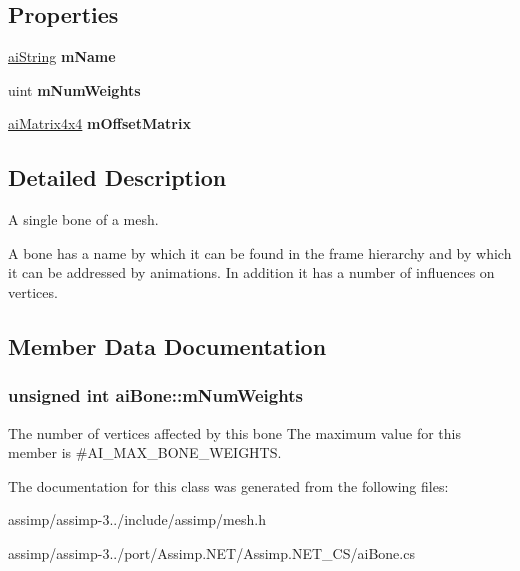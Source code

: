 \subsection*{Properties}
\begin{DoxyCompactItemize}
\item 
\hypertarget{structai_bone_a01c580c0d922dd2f2bbc89b28ee2f92d}{\hyperlink{structai_string}{ai\+String} {\bfseries m\+Name}}\label{structai_bone_a01c580c0d922dd2f2bbc89b28ee2f92d}

\item 
\hypertarget{structai_bone_a8bca8ce997ae82bf79edebdf9fbb562e}{uint {\bfseries m\+Num\+Weights}}\label{structai_bone_a8bca8ce997ae82bf79edebdf9fbb562e}

\item 
\hypertarget{structai_bone_a9ae5293b5c937436e4b338e20221cc2e}{\hyperlink{structai_matrix4x4}{ai\+Matrix4x4} {\bfseries m\+Offset\+Matrix}}\label{structai_bone_a9ae5293b5c937436e4b338e20221cc2e}

\end{DoxyCompactItemize}


\subsection{Detailed Description}
A single bone of a mesh. 

A bone has a name by which it can be found in the frame hierarchy and by which it can be addressed by animations. In addition it has a number of influences on vertices. 

\subsection{Member Data Documentation}
\hypertarget{structai_bone_a87a79d42a0132753aac66397ad6f9b71}{
\subsubsection[{m\+Num\+Weights}]{\setlength{\rightskip}{0pt plus 5cm}unsigned int ai\+Bone\+::m\+Num\+Weights}}\label{structai_bone_a87a79d42a0132753aac66397ad6f9b71}
The number of vertices affected by this bone The maximum value for this member is \#\+A\+I\+\_\+\+M\+A\+X\+\_\+\+B\+O\+N\+E\+\_\+\+W\+E\+I\+G\+H\+T\+S. 

The documentation for this class was generated from the following files\+:\begin{DoxyCompactItemize}
\item 
assimp/assimp-\/3../include/assimp/mesh.\+h\item 
assimp/assimp-\/3../port/\+Assimp.\+N\+E\+T/\+Assimp.\+N\+E\+T\+\_\+\+C\+S/ai\+Bone.\+cs\end{DoxyCompactItemize}
